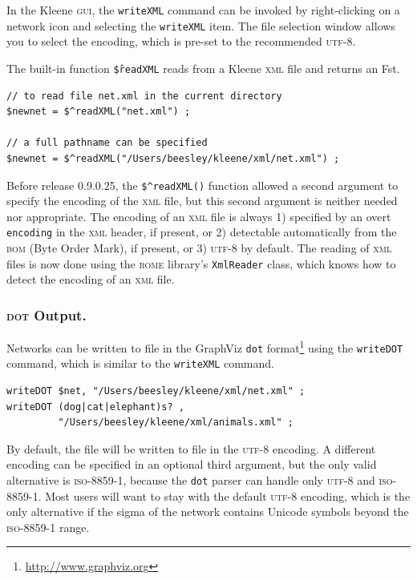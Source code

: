 \documentclass[letterpaper,12pt]{article}
\newcommand{\acro}{\textsc}
\begin{document}
In the Kleene \acro{gui}, the \verb!writeXML! command can be invoked by
right-clicking on a network icon and selecting the \verb!writeXML!
item.  The file selection window allows you to select the encoding,
which is pre-set to the recommended \acro{utf-8}.

The built-in function \texttt{\$\^readXML} reads from a Kleene \acro{xml} file and returns an Fst.

\begin{Verbatim}[fontsize=\small]
// to read file net.xml in the current directory
$newnet = $^readXML("net.xml") ;

// a full pathname can be specified
$newnet = $^readXML("/Users/beesley/kleene/xml/net.xml") ;
\end{Verbatim}

Before release 0.9.0.25, the \verb!$^readXML()! function allowed a second
argument to specify the encoding of the \acro{xml} file, but this second
argument is neither needed nor appropriate. The encoding of an
\acro{xml} file is always 1) specified by an overt \texttt{encoding} in
the \acro{xml} header, if present, or 2) detectable automatically from the
\acro{bom} (Byte Order Mark), if present, or 3) \acro{utf-8} by default.
The reading of \acro{xml} files is now done using the \acro{rome} library's
\texttt{XmlReader} class, which knows how to detect the encoding of an
\acro{xml} file.

\subsubsection{\acro{dot} Output.}

Networks can be written to file in the GraphViz \verb!dot!
format\footnote{\url{http://www.graphviz.org}} using the
\texttt{writeDOT} command, which is similar to the \texttt{writeXML} command.

\begin{Verbatim}[fontsize=\small]
writeDOT $net, "/Users/beesley/kleene/xml/net.xml" ;
writeDOT (dog|cat|elephant)s? , 
         "/Users/beesley/kleene/xml/animals.xml" ;
\end{Verbatim}

By default, the file will be written to file in the \acro{utf-8}
encoding.  A different encoding can be specified in an optional third
argument, but the only valid alternative is \acro{iso-8859-1}, because
the \verb!dot! parser can handle only \acro{utf-8} and \acro{iso-8859-1}.
Most users will want to stay with the default \acro{utf-8} encoding,
which is the only alternative if the sigma of the network contains
Unicode symbols beyond the \acro{iso-8859-1} range.
\end{document}
